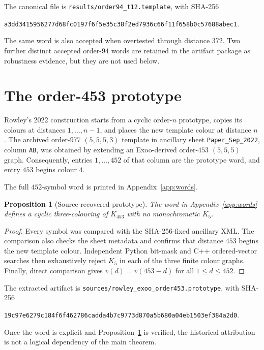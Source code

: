 \documentclass[11pt]{article}
\newtheorem{proposition}[theorem]{Proposition}
\theoremstyle{definition}
\theoremstyle{remark}
\newcommand{\code}[1]{\texttt{#1}}
\newcommand{\sha}[1]{\begingroup\ttfamily\scriptsize\urlstyle{same}\nolinkurl{#1}\endgroup}
\begin{document}
The canonical file is \code{results/order94\_t12.template}, with SHA-256
\begin{center}
\sha{a3dd3415956277d68fc0197f6f5e35c38f2ed7936c66f11f658b0c57688abec1}.
\end{center}
The same word is also accepted when overtested through distance $372$.
Two further distinct accepted order-$94$ words are retained in the artifact
package as robustness evidence, but they are not used below.

\section{The order-453 prototype}
\label{sec:prototype}

Rowley's 2022 construction starts from a cyclic order-$n$ prototype, copies
its colours at distances $1,\ldots,n-1$, and places the new template colour
at distance $n$ \cite[Section 5]{rowley-sat}.  The archived order-$977$
$(5,5,5,3)$ template in ancillary sheet \code{Paper\_Sep\_2022}, column
\code{AB}, was obtained by extending an Exoo-derived order-$453$
$(5,5,5)$ graph.  Consequently, entries $1,\ldots,452$ of that column are
the prototype word, and entry $453$ begins colour $4$.

The full $452$-symbol word is printed in Appendix~\ref{app:words}.

\begin{proposition}[Source-recovered prototype]
\label{prop:prototype}
The word in Appendix~\ref{app:words} defines a cyclic three-colouring of
$K_{453}$ with no monochromatic $K_5$.
\end{proposition}

\begin{proof}
Every symbol was compared with the SHA-256-fixed ancillary XML.  The
comparison also checks the sheet metadata and confirms that distance $453$
begins the new template colour.  Independent Python bit-mask and C++
ordered-vector searches then exhaustively reject $K_5$ in each of the three
finite colour graphs.  Finally, direct comparison gives
$v(d)=v(453-d)$ for all $1\le d\le452$.
\end{proof}

The extracted artifact is
\code{sources/rowley\_exoo\_order453.prototype}, with SHA-256
\begin{center}
\sha{19c97e6279c184f6f462786cadda4b7c9773d870a5b680a04eb1503ef384a2d0}.
\end{center}
Once the word is explicit and Proposition~\ref{prop:prototype} is verified,
the historical attribution is not a logical dependency of the main theorem.
\end{document}
